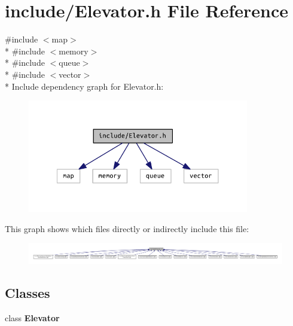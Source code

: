 \section{include/\+Elevator.h File Reference}
\label{_elevator_8h}
{\ttfamily \#include $<$map$>$}\\*
{\ttfamily \#include $<$memory$>$}\\*
{\ttfamily \#include $<$queue$>$}\\*
{\ttfamily \#include $<$vector$>$}\\*
Include dependency graph for Elevator.\+h\+:
\nopagebreak
\begin{figure}[H]
\begin{center}
\leavevmode
\includegraphics[width=274pt]{_elevator_8h__incl}
\end{center}
\end{figure}
This graph shows which files directly or indirectly include this file\+:
\nopagebreak
\begin{figure}[H]
\begin{center}
\leavevmode
\includegraphics[width=350pt]{_elevator_8h__dep__incl}
\end{center}
\end{figure}
\subsection*{Classes}
\begin{DoxyCompactItemize}
\item 
class {\bf Elevator}
\end{DoxyCompactItemize}
